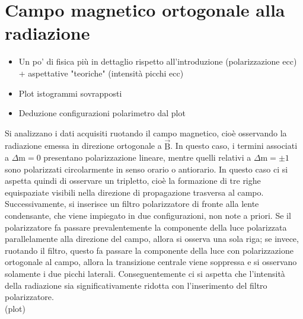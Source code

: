 \documentclass[twocolumn,10pt]{asme2ej}
\begin{document}
\section{Campo magnetico ortogonale alla radiazione}

\begin{itemize}
    \item Un po' di fisica più in dettaglio rispetto all'introduzione (polarizzazione ecc) + aspettative "teoriche"
    (intensità picchi ecc)
    \item Plot istogrammi sovrapposti 
    \item Deduzione configurazioni polarimetro dal plot 
\end{itemize}
Si analizzano i dati acquisiti ruotando il campo magnetico, cioè osservando la radiazione emessa 
in direzione ortogonale a $\vec{\text{B}}$. In questo caso, i termini associati a $\Delta \text{m} = 0$ presentano polarizzazione lineare, 
mentre quelli relativi a $\Delta \text{m} = \pm 1$ sono polarizzati circolarmente in senso orario o antiorario. 
In questo caso ci si aspetta quindi di osservare un tripletto, cioè la formazione di tre righe equispaziate visibili nella direzione 
di propagazione trasversa al campo. Successivamente, si inserisce un filtro polarizzatore di fronte alla lente condensante, che viene impiegato in due configurazioni, non note a priori. 
Se il polarizzatore fa passare prevalentemente la componente della luce polarizzata parallelamente alla direzione del campo, allora si osserva una sola riga; se invece, ruotando il filtro, questo 
fa passare la componente della luce con polarizzazione ortogonale al campo, allora la transizione centrale viene soppressa e si osservano solamente i due picchi laterali.
Conseguentemente ci si aspetta che l'intensità della radiazione sia significativamente ridotta con l'inserimento del filtro polarizzatore.  
\\ (plot)
\end{document}
